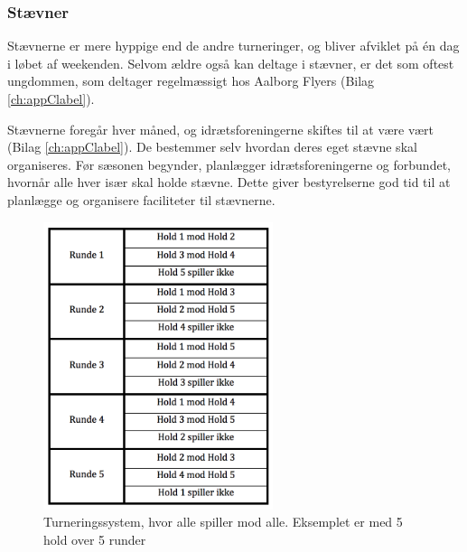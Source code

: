 \subsubsection{Stævner}\label{staevner}
Stævnerne er mere hyppige end de andre turneringer, og bliver afviklet på én dag i løbet af weekenden. Selvom ældre også kan deltage i stævner, er det som oftest ungdommen, som deltager regelmæssigt hos Aalborg Flyers (Bilag \ref{ch:appClabel}).
\par
Stævnerne foregår hver måned, og idrætsforeningerne skiftes til at være vært (Bilag \ref{ch:appClabel}). De bestemmer selv hvordan deres eget stævne skal organiseres. Før sæsonen begynder, planlægger idrætsforeningerne og forbundet, hvornår alle hver især skal holde stævne. Dette giver bestyrelserne god tid til at planlægge og organisere faciliteter til stævnerne. 
\\
\begin{figure}[H]
  \centering
  \includegraphics[width=0.6\textwidth]{figures/RoundRobin.png}
  \caption{Turneringssystem, hvor alle spiller mod alle. Eksemplet er med 5 hold over 5 runder}
  \label{fig:RoundRobin}
\end{figure}

